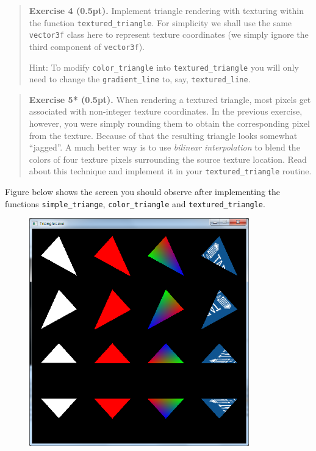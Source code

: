 \documentclass{article}
\newenvironment{exercise}[2]{\begin{verse}\textbf{Exercise #1 (#2pt).} }{
\end{verse}\medskip}
\begin{document}
\begin{exercise}{4}{0.5}
Implement triangle rendering with texturing within the function \verb#textured_triangle#. For simplicity we shall use the same \texttt{vector3f} class here to represent texture coordinates (we simply ignore the third component of \texttt{vector3f}).

Hint: To modify \verb#color_triangle# into \verb#textured_triangle# you will only need to change the \verb#gradient_line# to, say, \verb#textured_line#.
\end{exercise}

\begin{exercise}{5*}{0.5}
When rendering a textured triangle, most pixels get associated with non-integer texture coordinates. In the previous exercise, however, you were simply rounding them to obtain the corresponding pixel from the texture. Because of that the resulting triangle looks somewhat ``jagged''. A much better way is to use \emph{bilinear interpolation} to blend the colors of four texture pixels surrounding the source texture location. Read about this technique and implement it in your \verb#textured_triangle# routine.
\end{exercise}

Figure below shows the screen you should observe after implementing the functions \verb#simple_triange#, \verb#color_triangle# and \verb#textured_triangle#.

\begin{figure}[h!]
\centering
\includegraphics[width=0.85\textwidth]{screenshot.png}
\label{fig:screen}
\end{figure}
\end{document}
